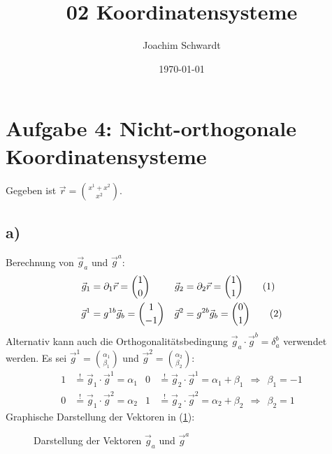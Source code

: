 \documentclass[a4paper,12pt]{article}
\newcommand\numberthis{\addtocounter{equation}{1}\tag{\theequation}}
\begin{document}
\title{02 Koordinatensysteme}
\author{Joachim Schwardt}
\date{\today}
\maketitle

\section*{Aufgabe 4: Nicht-orthogonale Koordinatensysteme}
Gegeben ist $\vec{r}=\binom{x^1+x^2}{x^2}$.
\subsection*{a)}Berechnung von $\vec{g}_a$ und $\vec{g}^a$:
\begin{align*}
\vec{g}_1&=\partial_1\vec{r}=\binom{1}{0}&\vec{g}_2&=\partial_2\vec{r}=\binom{1}{1}\numberthis\label{eqn:g unten a}\\
\vec{g}^1&=g^{1b}\vec{g}_b=\binom{1}{-1}&\vec{g}^2&=g^{2b}\vec{g}_b=\binom{0}{1}\numberthis\label{eqn:g oben a}
\end{align*}
Alternativ kann auch die Orthogonalitätsbedingung $\vec{g}_a\cdot\vec{g}^b=\delta_a^b$ verwendet werden. Es sei $\vec{g}^{1}=\binom{\alpha_{1}}{\beta_{1}}$ und $\vec{g}^{2}=\binom{\alpha_{2}}{\beta_{2}}$:
\begin{align*}
1&\overset{!}{=}\vec{g}_1\cdot\vec{g}^1=\alpha_1&0&\overset{!}{=}\vec{g}_2\cdot\vec{g}^1=\alpha_1+\beta_1\ \ \Rightarrow\ \ \beta_1=-1\\
0&\overset{!}{=}\vec{g}_1\cdot\vec{g}^2=\alpha_2&1&\overset{!}{=}\vec{g}_2\cdot\vec{g}^2=\alpha_2+\beta_2\ \ \Rightarrow\ \ \beta_2=1
\end{align*}
Graphische Darstellung der Vektoren in (\ref{figure:g oben unten a}):
\begin{figure}[h!]
\centering
{}
\caption{Darstellung der Vektoren $\vec{g}_a$ und $\vec{g}^a$}
\label{figure:g oben unten a}
\end{figure}
\end{document}
